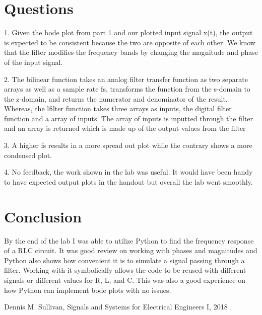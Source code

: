 \documentclass[12pt]{report}
\begin{document}
\section{Questions}
1. Given the bode plot from part 1 and our plotted input signal x(t), the output is expected to be consistent because the two are opposite of each other. We know that the filter modifies the frequency bands by changing the magnitude and phase of the input signal. 

2. The bilinear function takes an analog filter transfer function as two separate arrays as well as a sample rate fs, transforms the function from the s-domain to the z-domain, and returns the numerator and denominator of the result.
Whereas, the lfilter function takes three arrays as inputs, the digital filter function and a array of inputs. The array of inputs is inputted through the filter and an array is returned which is made up of the output values from the filter

3.  A higher fs results in a more spread out plot while the contrary shows a more condensed plot. 

4. No feedback, the work shown in the lab was useful. It would have been handy to have expected output plots in the handout but overall the lab went smoothly.     


\section{Conclusion}

By the end of the lab I was able to utilize Python to find the frequency response of a RLC circuit. It was good review on working with phases and magnitudes and Python also shows how convenient it is to simulate a signal passing through a filter. Working with it symbolically allows the code to be reused with different signals or different values for R, L, and C. This was also a good experience on how Python can implement bode plots with no issues. 

\newpage


\begin{thebibliography}{111}
Dennis M. Sullivan,
Signals and Systems for Electrical Engineers I,
 2018
\end{thebibliography}
\end{document}
